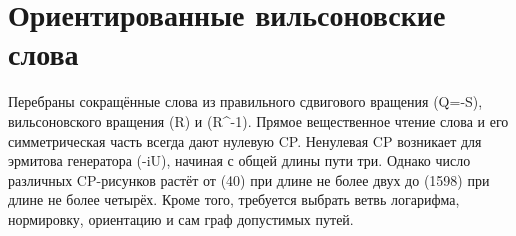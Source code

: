 \section*{Ориентированные вильсоновские слова}

Перебраны сокращённые слова из правильного сдвигового вращения (Q=-S),
вильсоновского вращения (R) и (R^{-1}). Прямое вещественное чтение слова
и его симметрическая часть всегда дают нулевую CP. Ненулевая CP возникает
для эрмитова генератора (-iU), начиная с общей длины пути
три. Однако число различных CP-рисунков растёт от (40) при длине не более
двух до (1598) при длине не более четырёх. Кроме того, требуется выбрать
ветвь логарифма, нормировку, ориентацию и сам граф допустимых путей.
